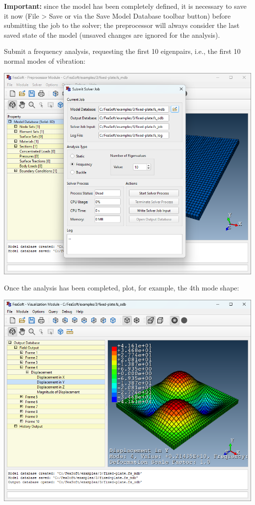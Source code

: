 \documentclass[
    11pt,        %
    a4paper,     %
    final,       %
    fleqn,       %
    notitlepage, %
    onecolumn,   %
    oneside,     %
]{article}
\begin{document}
\textbf{Important:} since the model has been completely defined, it is necessary to save it now (File > Save or via the Save Model Database toolbar button) before submitting the job to the solver; the preprocessor will always consider the last saved state of the model (unsaved changes are ignored for the analysis).

Submit a frequency analysis, requesting the first 10 eigenpairs, i.e., the first 10 normal modes of vibration:
\begin{center}
    \includegraphics[scale=0.5]{fig/ui-3-9.png}
\end{center}

Once the analysis has been completed, plot, for example, the 4th mode shape:
\begin{center}
    \includegraphics[scale=0.5]{fig/ui-3-10.png}
\end{center}
\end{document}
